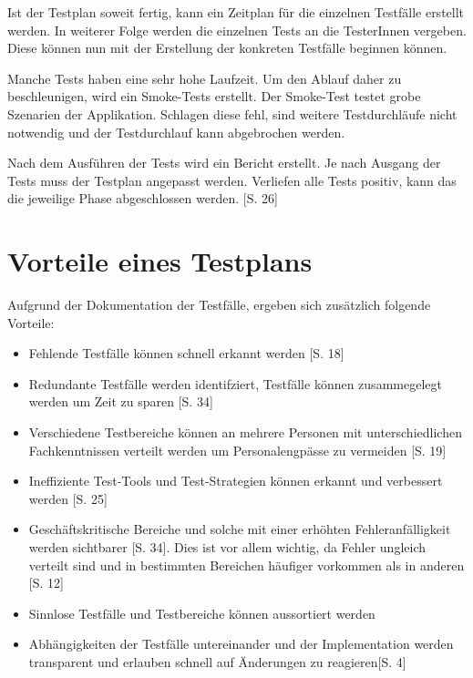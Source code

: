 \documentclass[a4paper,bibtotoc,oneside]{scrbook}
\begin{document}
Ist der Testplan soweit fertig, kann ein Zeitplan für die einzelnen Testfälle erstellt werden. In weiterer Folge werden die einzelnen Tests an die TesterInnen vergeben. Diese können nun mit der Erstellung der konkreten Testfälle beginnen können.

Manche Tests haben eine sehr hohe Laufzeit. Um den Ablauf daher zu beschleunigen, wird ein Smoke-Tests erstellt. Der Smoke-Test testet grobe Szenarien der Applikation. Schlagen diese fehl, sind weitere Testdurchläufe nicht notwendig und der Testdurchlauf kann abgebrochen werden. 

Nach dem Ausführen der Tests wird ein Bericht erstellt. Je nach Ausgang der Tests muss der Testplan angepasst werden. Verliefen alle Tests positiv, kann das die jeweilige Phase abgeschlossen werden. \cite{eval_regression}[S. 26]


\section{Vorteile eines Testplans}

Aufgrund der Dokumentation der Testfälle, ergeben sich zusätzlich folgende Vorteile:

\begin{itemize}
	\item Fehlende Testfälle können schnell erkannt werden \cite{test_large_systems}[S. 18]
	\item Redundante Testfälle werden identifziert, Testfälle können zusammegelegt werden um Zeit zu sparen \cite{testing_apps_on_web}[S. 34]
	\item Verschiedene Testbereiche können an mehrere Personen mit unterschiedlichen Fachkenntnissen verteilt werden um Personalengpässe zu vermeiden \cite{test_large_systems}[S. 19]
	\item Ineffiziente Test-Tools und Test-Strategien können erkannt und verbessert werden \cite{eval_regression}[S. 25]
	\item Geschäftskritische Bereiche und solche mit einer erhöhten  Fehleranfälligkeit werden sichtbarer \cite{testing_apps_on_web}[S. 34]. Dies ist vor allem wichtig, da Fehler ungleich verteilt sind und in bestimmten Bereichen häufiger vorkommen als in anderen \cite{eval_regression}[S. 12]
	\item Sinnlose Testfälle und Testbereiche können aussortiert werden 
	\item Abhängigkeiten der Testfälle untereinander und der Implementation werden transparent und erlauben schnell auf Änderungen zu reagieren\cite{test_auto}[S. 4]
\end{itemize}
\end{document}
